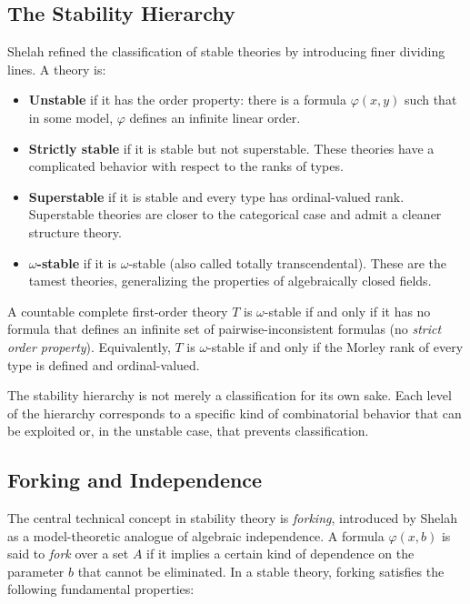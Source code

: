 \subsection{The Stability Hierarchy}

Shelah refined the classification of stable theories by introducing finer dividing lines. A theory is:
\begin{itemize}
    \item \textbf{Unstable} if it has the order property: there is a formula \(\varphi(x,y)\) such that in some model, \(\varphi\) defines an infinite linear order.
    \item \textbf{Strictly stable} if it is stable but not superstable. These theories have a complicated behavior with respect to the ranks of types.
    \item \textbf{Superstable} if it is stable and every type has ordinal-valued rank. Superstable theories are closer to the categorical case and admit a cleaner structure theory.
    \item \textbf{\(\omega\)-stable} if it is \(\omega\)-stable (also called totally transcendental). These are the tamest theories, generalizing the properties of algebraically closed fields.
\end{itemize}

\begin{theorem}[Shelah, 1970]
A countable complete first-order theory \(T\) is \(\omega\)-stable if and only if it has no formula that defines an infinite set of pairwise-inconsistent formulas (no \emph{strict order property}). Equivalently, \(T\) is \(\omega\)-stable if and only if the Morley rank of every type is defined and ordinal-valued.
\end{theorem}

The stability hierarchy is not merely a classification for its own sake. Each level of the hierarchy corresponds to a specific kind of combinatorial behavior that can be exploited or, in the unstable case, that prevents classification.

\subsection{Forking and Independence}

The central technical concept in stability theory is \emph{forking}, introduced by Shelah as a model-theoretic analogue of algebraic independence. A formula \(\varphi(x,b)\) is said to \emph{fork} over a set \(A\) if it implies a certain kind of dependence on the parameter \(b\) that cannot be eliminated. In a stable theory, forking satisfies the following fundamental properties:

